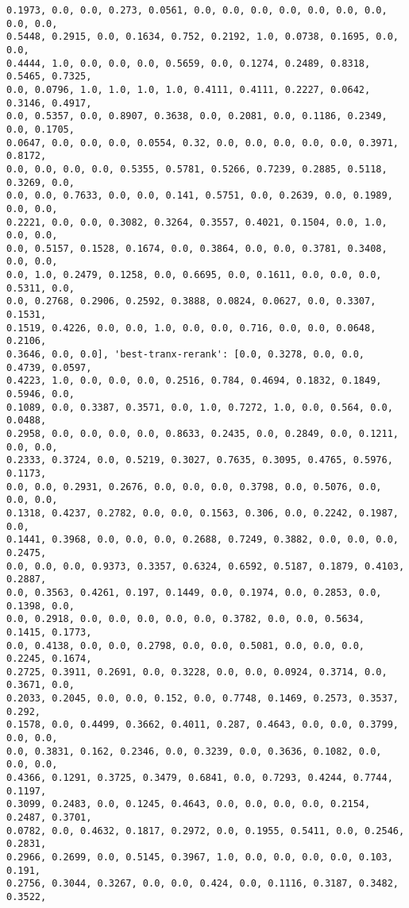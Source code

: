 \documentclass[11pt]{article}
\begin{document}
\begin{Verbatim}[commandchars=\\\{\}]
0.1973, 0.0, 0.0, 0.273, 0.0561, 0.0, 0.0, 0.0, 0.0, 0.0, 0.0, 0.0, 0.0, 0.0,
0.5448, 0.2915, 0.0, 0.1634, 0.752, 0.2192, 1.0, 0.0738, 0.1695, 0.0, 0.0,
0.4444, 1.0, 0.0, 0.0, 0.0, 0.5659, 0.0, 0.1274, 0.2489, 0.8318, 0.5465, 0.7325,
0.0, 0.0796, 1.0, 1.0, 1.0, 1.0, 0.4111, 0.4111, 0.2227, 0.0642, 0.3146, 0.4917,
0.0, 0.5357, 0.0, 0.8907, 0.3638, 0.0, 0.2081, 0.0, 0.1186, 0.2349, 0.0, 0.1705,
0.0647, 0.0, 0.0, 0.0, 0.0554, 0.32, 0.0, 0.0, 0.0, 0.0, 0.0, 0.3971, 0.8172,
0.0, 0.0, 0.0, 0.0, 0.5355, 0.5781, 0.5266, 0.7239, 0.2885, 0.5118, 0.3269, 0.0,
0.0, 0.0, 0.7633, 0.0, 0.0, 0.141, 0.5751, 0.0, 0.2639, 0.0, 0.1989, 0.0, 0.0,
0.2221, 0.0, 0.0, 0.3082, 0.3264, 0.3557, 0.4021, 0.1504, 0.0, 1.0, 0.0, 0.0,
0.0, 0.5157, 0.1528, 0.1674, 0.0, 0.3864, 0.0, 0.0, 0.3781, 0.3408, 0.0, 0.0,
0.0, 1.0, 0.2479, 0.1258, 0.0, 0.6695, 0.0, 0.1611, 0.0, 0.0, 0.0, 0.5311, 0.0,
0.0, 0.2768, 0.2906, 0.2592, 0.3888, 0.0824, 0.0627, 0.0, 0.3307, 0.1531,
0.1519, 0.4226, 0.0, 0.0, 1.0, 0.0, 0.0, 0.716, 0.0, 0.0, 0.0648, 0.2106,
0.3646, 0.0, 0.0], 'best-tranx-rerank': [0.0, 0.3278, 0.0, 0.0, 0.4739, 0.0597,
0.4223, 1.0, 0.0, 0.0, 0.0, 0.2516, 0.784, 0.4694, 0.1832, 0.1849, 0.5946, 0.0,
0.1089, 0.0, 0.3387, 0.3571, 0.0, 1.0, 0.7272, 1.0, 0.0, 0.564, 0.0, 0.0488,
0.2958, 0.0, 0.0, 0.0, 0.0, 0.8633, 0.2435, 0.0, 0.2849, 0.0, 0.1211, 0.0, 0.0,
0.2333, 0.3724, 0.0, 0.5219, 0.3027, 0.7635, 0.3095, 0.4765, 0.5976, 0.1173,
0.0, 0.0, 0.2931, 0.2676, 0.0, 0.0, 0.0, 0.3798, 0.0, 0.5076, 0.0, 0.0, 0.0,
0.1318, 0.4237, 0.2782, 0.0, 0.0, 0.1563, 0.306, 0.0, 0.2242, 0.1987, 0.0,
0.1441, 0.3968, 0.0, 0.0, 0.0, 0.2688, 0.7249, 0.3882, 0.0, 0.0, 0.0, 0.2475,
0.0, 0.0, 0.0, 0.9373, 0.3357, 0.6324, 0.6592, 0.5187, 0.1879, 0.4103, 0.2887,
0.0, 0.3563, 0.4261, 0.197, 0.1449, 0.0, 0.1974, 0.0, 0.2853, 0.0, 0.1398, 0.0,
0.0, 0.2918, 0.0, 0.0, 0.0, 0.0, 0.0, 0.3782, 0.0, 0.0, 0.5634, 0.1415, 0.1773,
0.0, 0.4138, 0.0, 0.0, 0.2798, 0.0, 0.0, 0.5081, 0.0, 0.0, 0.0, 0.2245, 0.1674,
0.2725, 0.3911, 0.2691, 0.0, 0.3228, 0.0, 0.0, 0.0924, 0.3714, 0.0, 0.3671, 0.0,
0.2033, 0.2045, 0.0, 0.0, 0.152, 0.0, 0.7748, 0.1469, 0.2573, 0.3537, 0.292,
0.1578, 0.0, 0.4499, 0.3662, 0.4011, 0.287, 0.4643, 0.0, 0.0, 0.3799, 0.0, 0.0,
0.0, 0.3831, 0.162, 0.2346, 0.0, 0.3239, 0.0, 0.3636, 0.1082, 0.0, 0.0, 0.0,
0.4366, 0.1291, 0.3725, 0.3479, 0.6841, 0.0, 0.7293, 0.4244, 0.7744, 0.1197,
0.3099, 0.2483, 0.0, 0.1245, 0.4643, 0.0, 0.0, 0.0, 0.0, 0.2154, 0.2487, 0.3701,
0.0782, 0.0, 0.4632, 0.1817, 0.2972, 0.0, 0.1955, 0.5411, 0.0, 0.2546, 0.2831,
0.2966, 0.2699, 0.0, 0.5145, 0.3967, 1.0, 0.0, 0.0, 0.0, 0.0, 0.103, 0.191,
0.2756, 0.3044, 0.3267, 0.0, 0.0, 0.424, 0.0, 0.1116, 0.3187, 0.3482, 0.3522,

\end{Verbatim}
\end{document}
